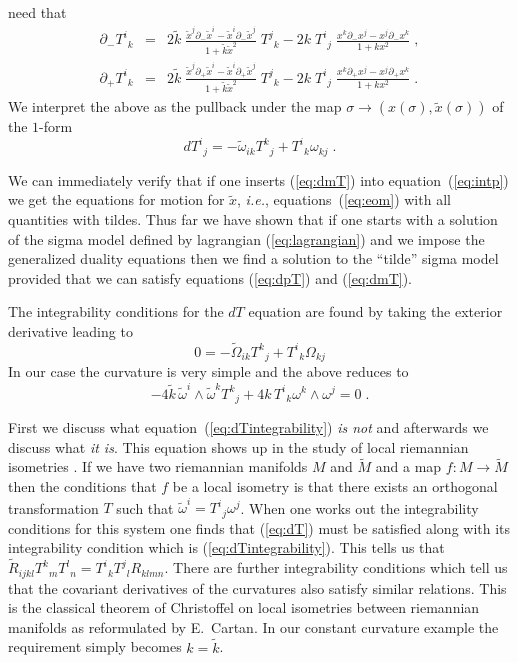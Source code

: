 \documentclass[a4paper,12pt]{article}
\newcommand{\Mtil}{\widetilde{M}}
\newcommand{\Tij}{T^{i}{}_{j}}
\newcommand{\Tik}{T^{i}{}_{k}}
\newcommand{\Tjk}{T^{j}{}_{k}}
\newcommand{\Tkj}{T^{k}{}_{j}}
\newcommand{\dminus}{\partial_{-}}
\newcommand{\dplus}{\partial_{+}}
\newcommand{\ktil}{\tilde{k}}
\newcommand{\omegatil}{\tilde{\omega}}
\newcommand{\xtil}{\tilde{x}}
\begin{document}
need that
\begin{eqnarray}
    \dminus \Tik & = &  2\ktil\; \frac{\xtil^{j}\dminus \xtil^{i}
	- \xtil^{i}\dminus \xtil^{j}}{1 + \ktil \xtil^{2}}\;\Tjk
      -  2k\;
     \Tij\; \frac{x^{k} \dminus x^{j} - x^{j} \dminus x^{k}}{1 + 
     kx^{2}}\;,
	\label{eq:dmT} \\
    \dplus \Tik & = & 2\ktil\;
     	\frac{\xtil^{j}\dplus \xtil^{i}
	- \xtil^{i}\dplus \xtil^{j}}{1 + \ktil \xtil^{2}}\;\Tjk
      -  2k\;\Tij\; 
	\frac{x^{k} \dplus x^{j} - x^{j} \dplus x^{k}}{1 + kx^{2}}\;.
	\label{eq:dpT}
\end{eqnarray}
We interpret the above as the pullback under the map $\sigma 
\to (x(\sigma), \xtil(\sigma))$ of the $1$-form
\begin{equation}
    d\Tij = -\omegatil_{ik}\Tkj + \Tik\omega_{kj}\;.
    \label{eq:dT}
\end{equation}

We can immediately verify that if one inserts (\ref{eq:dmT}) into 
equation~(\ref{eq:intp}) we get the equations for motion for 
$\xtil$, \emph{i.e.}, equations~(\ref{eq:eom}) with all quantities with 
tildes. Thus far we have shown that if one starts with a solution of 
the sigma model defined by lagrangian (\ref{eq:lagrangian}) and we 
impose the generalized duality equations then we find a solution to 
the ``tilde'' sigma model provided that we can satisfy equations 
(\ref{eq:dpT}) and (\ref{eq:dmT}).

The integrability conditions for the $dT$ equation are found by taking the 
exterior derivative leading to
\begin{equation}
    0 = - \widetilde{\Omega}_{ik}\Tkj + \Tik\Omega_{kj}
    \label{eq:dTintegrability}
\end{equation}
In our case the curvature is very simple and the above reduces to 
\begin{equation}
    -4\ktil\, \omegatil^{i}\wedge\omegatil^{k}\Tkj + 4k\, \Tik 
    \omega^{k}\wedge\omega^{j}=0\;.
    \label{eq:kktil}
\end{equation}


First we discuss what equation~(\ref{eq:dTintegrability}) \emph{is
not} and afterwards we discuss what \emph{it is}.  This equation shows
up in the study of local riemannian isometries \cite{BCG3}.  If we
have two riemannian manifolds $M$ and $\Mtil$ and a map $f:M\to\Mtil$
then the conditions that $f$ be a local isometry is that there exists
an orthogonal transformation $T$ such that
$\omegatil^{i}=\Tij\omega^{j}$.  When one works out the integrability
conditions for this system one finds that (\ref{eq:dT}) must be
satisfied along with its integrability condition which is
(\ref{eq:dTintegrability}).  This tells us that
$\widetilde{R}_{ijkl}T^{k}{}_{m}T^{l}{}_{n}= T^{i}{}_{k}T^{j}{}_{l}
R_{klmn}$.  There are further integrability conditions which tell us
that the covariant derivatives of the curvatures also satisfy similar
relations.  This is the classical theorem of Christoffel on local
isometries between riemannian manifolds as reformulated by E.~Cartan. 
In our constant curvature example the requirement simply becomes
$k=\ktil$.
\end{document}

